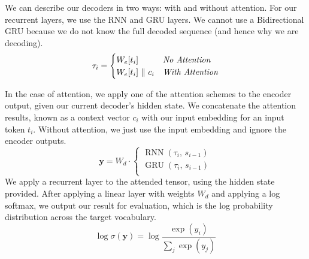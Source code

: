 \documentclass[twoside,twocolumn]{article}
\begin{document}
We can describe our decoders in two ways: with and without attention. For
our recurrent layers, we use the RNN and GRU layers. We cannot use a
Bidirectional GRU because we do not know the full decoded sequence
(and hence why we are decoding).
\begin{equation}
  \tau_i = \begin{cases}
    W_e[t_i] & \emph{No Attention} \\
    W_e[t_i] \,\, \Vert \,\, c_i & \emph{With Attention} \\
  \end{cases}
\end{equation}

In the case of attention, we apply one of the attention schemes
to the encoder output, given our current decoder's
hidden state. We concatenate the attention results, known as a context vector
$c_i$ with our input embedding for an input token $t_i$.
Without attention, we just use the input embedding and ignore the encoder
outputs.
\begin{equation}
  \mathbf{y} = W_d \cdot \begin{cases}
      \operatorname{RNN} (\tau_i, \, s_{i-1}) \\
      \operatorname{GRU} (\tau_i, \, s_{i-1}) \\
    \end{cases}
\end{equation}
We apply a recurrent layer to the attended tensor, using the hidden state
provided. After applying a linear layer with weights $W_d$ and applying a log
softmax, we output our result for evaluation, which is the log probability
distribution across the target vocabulary.
\begin{equation}
  \log \sigma(\mathbf{y}) = \log \frac{\exp(y_i)}{\sum_j \exp(y_j)}
\end{equation}
\end{document}
